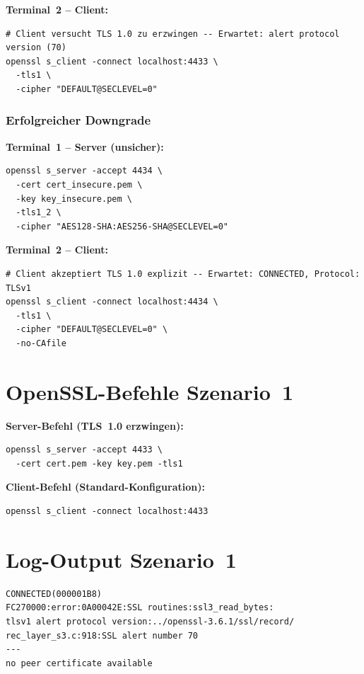 \noindent\textbf{Terminal~2 -- Client:}
\begin{lstlisting}[style=consolestyle]
# Client versucht TLS 1.0 zu erzwingen -- Erwartet: alert protocol version (70)
openssl s_client -connect localhost:4433 \
  -tls1 \
  -cipher "DEFAULT@SECLEVEL=0"
\end{lstlisting}

\subsubsection*{Erfolgreicher Downgrade}
\noindent\textbf{Terminal~1 -- Server (unsicher):}
\begin{lstlisting}[style=consolestyle]
openssl s_server -accept 4434 \
  -cert cert_insecure.pem \
  -key key_insecure.pem \
  -tls1_2 \
  -cipher "AES128-SHA:AES256-SHA@SECLEVEL=0"
\end{lstlisting}

\noindent\textbf{Terminal~2 -- Client:}
\begin{lstlisting}[style=consolestyle]
# Client akzeptiert TLS 1.0 explizit -- Erwartet: CONNECTED, Protocol: TLSv1
openssl s_client -connect localhost:4434 \
  -tls1 \
  -cipher "DEFAULT@SECLEVEL=0" \
  -no-CAfile
\end{lstlisting}

\section{OpenSSL-Befehle Szenario~1}
\label{app:sz1-befehle}

\textbf{Server-Befehl (TLS~1.0 erzwingen):}
\begin{lstlisting}[style=consolestyle]
openssl s_server -accept 4433 \
  -cert cert.pem -key key.pem -tls1
\end{lstlisting}

\noindent\textbf{Client-Befehl (Standard-Konfiguration):}
\begin{lstlisting}[style=consolestyle]
openssl s_client -connect localhost:4433
\end{lstlisting}

\section{Log-Output Szenario~1}
\label{app:sz1-log}

\begin{lstlisting}
CONNECTED(000001B8)
FC270000:error:0A00042E:SSL routines:ssl3_read_bytes:
tlsv1 alert protocol version:../openssl-3.6.1/ssl/record/
rec_layer_s3.c:918:SSL alert number 70
---
no peer certificate available
\end{lstlisting}


